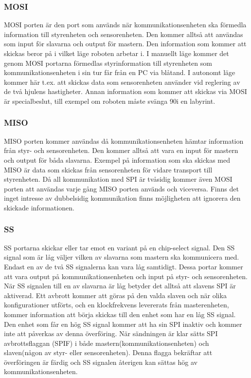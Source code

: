 \subsubsection{MOSI}
MOSI porten är den port som används när kommunikationsenheten ska förmedla
information till styrenheten och sensorenheten. Den kommer alltså att användas som
input för slavarna och output för mastern. Den information som kommer att
skickas beror på i vilket läge roboten arbetar i. I manuellt läge kommer det
genom MOSI portarna förmedlas styrinformation till styrenheten som
kommunikationsenheten i sin tur får från en PC via blåtand. I autonomt läge
kommer här t.ex. att skickas data som sensorenheten använder vid
reglering av de två hjulens hastigheter. Annan information som kommer att skickas via MOSI är
specialbeslut, till exempel om roboten måste svänga 90\degree i en labyrint.

\subsubsection{MISO}
MISO porten kommer användas då kommunikationsenheten hämtar information från styr- och sensorenheten. Den kommer alltså att vara en input för mastern och output för båda slavarna. Exempel på information som ska skickas med MISO är data som skickas från sensorenheten för vidare transport till styrenheten.
Då all kommunikation med SPI är tvåsidig kommer även MOSI porten att användas varje gång MISO porten används och viceversa. Finns det inget intresse av dubbelsidig kommunikation finns möjligheten att ignorera den skickade informationen.

\subsubsection{SS}
SS portarna skickar eller tar emot en variant på en chip-select signal. Den SS signal som är låg väljer vilken av slavarna som mastern ska kommunicera med. Endast en av de två SS signalerna kan vara låg samtidigt. Dessa portar kommer att vara output på kommunikationsenheten och input på styr- och sensorenheten.
När SS signalen till en av slavarna är låg betyder det alltså att slavens SPI är aktiverad. Ett avbrott kommer att göras på den valda slaven och när olika konfigurationer utförts, och en klockfrekvens levererats från masterenheten, kommer information att börja skickas till den enhet som har en låg SS signal. Den enhet som får en hög SS signal kommer att ha sin SPI inaktiv och kommer inte att påverkas av denna överföring.
När sändningen är klar sätts SPI avbrottsflaggan (SPIF) i både mastern(kommunikationsenheten) och slaven(någon av styr- eller sensorenheten). Denna flagga bekräftar att överföringen är färdig och SS signalen återigen kan sättas hög av kommunikationsenheten.

